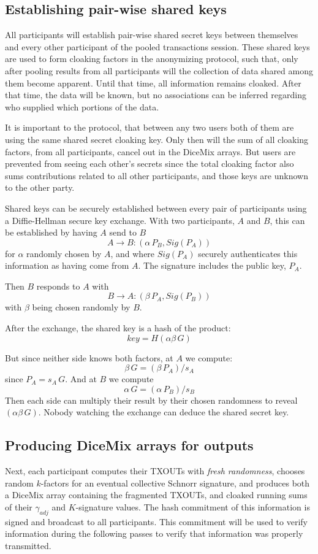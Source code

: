 \documentclass[8pt,fleqn,openany]{book}
\begin{document}
\subsection{Establishing pair-wise shared keys} 
All participants will establish pair-wise shared secret keys between themselves and every other participant of the pooled transactions session. These shared keys are used to form cloaking factors in the anonymizing protocol, such that, only after pooling results from all participants will the collection of data shared among them become apparent. Until that time, all information remains cloaked. After that time, the data will be known, but no associations can be inferred regarding who supplied which portions of the data. 

It is important to the protocol, that between any two users both of them are using the same shared secret cloaking key. Only then will the sum of all cloaking factors, from all participants, cancel out in the DiceMix arrays. But users are prevented from seeing each other’s secrets since the total cloaking factor also sums contributions related to all other participants, and those keys are unknown to the other party.

Shared keys can be securely established between every pair of participants using a Diffie-Hellman secure key exchange\cite{c21}. With two participants, $A$ and $B$, this can be established by having $A$ send to $B$
$$A \rightarrow B: (\alpha \, P_B, Sig(P_A))$$
for $\alpha$ randomly chosen by $A$, and where $Sig(P_A)$ securely authenticates this information as having come from $A$. The signature includes the public key, $P_A$. 

Then $B$ responds to $A$ with
$$B \rightarrow A: (\beta \, P_A, Sig(P_B))$$
with $\beta$ being chosen randomly by $B$. 

After the exchange, the shared key is a hash of the product:
$$key = H(\alpha \beta \, G)$$ 

But since neither side knows both factors, at $A$ we compute:
$$\beta \, G = (\beta \, P_A) / s_A$$
since $P_A = s_A \, G$. And at $B$ we compute
$$\alpha \, G = (\alpha \, P_B) / s_B$$
Then each side can multiply their result by their chosen randomness to reveal $(\alpha \beta \, G)$. Nobody watching the exchange can deduce the shared secret key.

\subsection{Producing DiceMix arrays for outputs} 
Next, each participant computes their TXOUTs with \textit{fresh randomness}, chooses random $k$-factors for an eventual collective Schnorr signature, and produces both a DiceMix array containing the fragmented TXOUTs, and cloaked running sums of their $\gamma_{adj}$ and $K$-signature values. The hash commitment of this information is signed and broadcast to all participants. This commitment will be used to verify information during the following passes to verify that information was properly transmitted.
\end{document}
